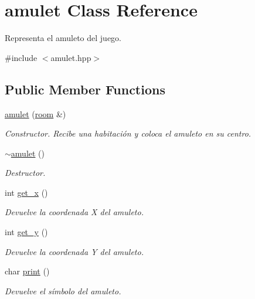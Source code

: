 \hypertarget{classamulet}{\section{amulet Class Reference}
\label{classamulet}
}


Representa el amuleto del juego.  




{\ttfamily \#include $<$amulet.\-hpp$>$}

\subsection*{Public Member Functions}
\begin{DoxyCompactItemize}
\item 
\hyperlink{classamulet_a1041bc50027b10326a887423940a0907}{amulet} (\hyperlink{classroom}{room} \&)
\begin{DoxyCompactList}\small\item\em Constructor. Recibe una habitación y coloca el amuleto en su centro. \end{DoxyCompactList}\item 
\hypertarget{classamulet_a06c7548ccceb5406ace40fec64ceda7c}{\hyperlink{classamulet_a06c7548ccceb5406ace40fec64ceda7c}{$\sim$amulet} ()}\label{classamulet_a06c7548ccceb5406ace40fec64ceda7c}

\begin{DoxyCompactList}\small\item\em Destructor. \end{DoxyCompactList}\item 
int \hyperlink{classamulet_ad8ea19e6207bfd45af252ec59758100b}{get\-\_\-x} ()
\begin{DoxyCompactList}\small\item\em Devuelve la coordenada X del amuleto. \end{DoxyCompactList}\item 
int \hyperlink{classamulet_aa89b81940657c0e6145050805c452101}{get\-\_\-y} ()
\begin{DoxyCompactList}\small\item\em Devuelve la coordenada Y del amuleto. \end{DoxyCompactList}\item 
char \hyperlink{classamulet_a0be0f91601085856b309e7616c3e1b2a}{print} ()
\begin{DoxyCompactList}\small\item\em Devuelve el símbolo del amuleto. \end{DoxyCompactList}\end{DoxyCompactItemize}


